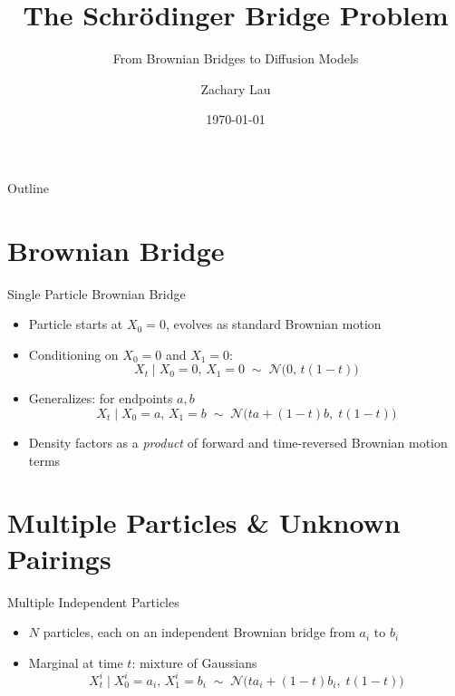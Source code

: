 \documentclass{beamer}
\title{The Schrödinger Bridge Problem}
\subtitle{From Brownian Bridges to Diffusion Models}
\author{Zachary Lau}
\institute{STAT 547E}
\date{\today}
\newcommand{\Norm}{\mathcal{N}}
\begin{document}
\begin{frame}
  \titlepage{}
\end{frame}

\begin{frame}{Outline}
  \tableofcontents
\end{frame}

\section{Brownian Bridge}

\begin{frame}{Single Particle Brownian Bridge}
  \begin{itemize}
    \item Particle starts at $X_0 = 0$, evolves as standard Brownian motion
    \item Conditioning on $X_0 = 0$ and $X_1 = 0$:
    \[
      X_t \mid X_0 = 0,\, X_1 = 0 \;\sim\; \Norm\!\bigl(0,\, t(1-t)\bigr)
    \]
    \item Generalizes: for endpoints $a, b$
    \[
      X_t \mid X_0 = a,\, X_1 = b \;\sim\; \Norm\!\bigl(ta + (1-t)b,\; t(1-t)\bigr)
    \]
    \item Density factors as a \emph{product} of forward and time-reversed Brownian motion terms~\cite{Schrodinger1932}
  \end{itemize}
\end{frame}

\section{Multiple Particles \& Unknown Pairings}

\begin{frame}{Multiple Independent Particles}
  \begin{itemize}
    \item $N$ particles, each on an independent Brownian bridge from $a_i$ to $b_i$
    \item Marginal at time $t$: mixture of Gaussians
    \[
      X^i_t \mid X^i_0 = a_i,\, X^i_1 = b_i \;\sim\; \Norm\!\bigl(ta_i + (1-t)b_i,\; t(1-t)\bigr)
    \]
  \end{itemize}
\end{frame}
\end{document}
